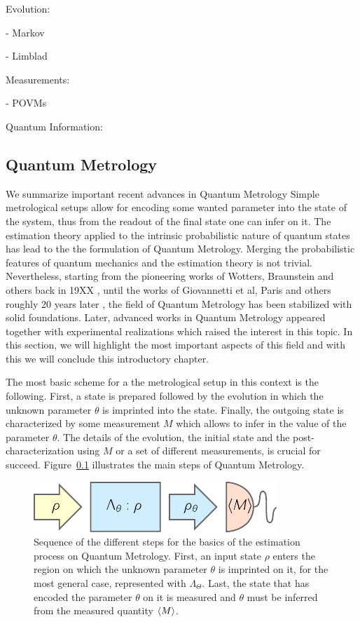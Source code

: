 Evolution:

- Markov

- Limblad

Measurements:

- POVMs

Quantum Information:

\subsection{Quantum Metrology}

We summarize important recent advances in Quantum Metrology
Simple metrological setups allow for encoding some wanted parameter into the state of the system, thus from the readout of the final state one can infer on it.
The estimation theory applied to the intrinsic probabilistic nature of quantum states has lead to the the formulation of Quantum Metrology.
Merging the probabilistic features of quantum mechanics and the estimation theory is not trivial.
Nevertheless, starting from the pioneering works of Wotters, Braunstein and others back in 19XX \citep{}, until the works of Giovannetti et al, Paris and others roughly 20 years later \citep{}, the field of Quantum Metrology has been stabilized with solid foundations.
Later, advanced works in Quantum Metrology appeared \citep{} together with experimental realizations \citep{} which raised the interest in this topic.
In this section, we will highlight the most important aspects of this field and with this we will conclude this introductory chapter.

The most basic scheme for a the metrological setup in this context is the following.
First, a state is prepared followed by the evolution in which the unknown parameter $\theta$ is imprinted into the state.
Finally, the outgoing state is characterized by some measurement $M$ which allows to infer in the value of the parameter $\theta$.
The details of the evolution, the initial state and the post-characterization using $M$ or a set of different measurements, is crucial for succeed.
Figure~\ref{} illustrates the main steps of Quantum Metrology.
\begin{figure}
  \centering
  \includegraphics[scale=1.4]{img/BG_preparation_encoding_estimation.pdf}
  \caption[Quantum Metrology estimation process]{Sequence of the different steps for the basics of the estimation process on Quantum Metrology. First, an input state $\rho$ enters the region on which the unknown parameter $\theta$ is imprinted on it, for the most general case, represented with $\Lambda_{\Theta}$. Last, the state that has encoded the parameter $\theta$ on it is measured and $\theta$ must be inferred from the measured quantity $\langle M \rangle$.}
  \label{fig:bg-preparation-encoding-estimation}
\end{figure}

